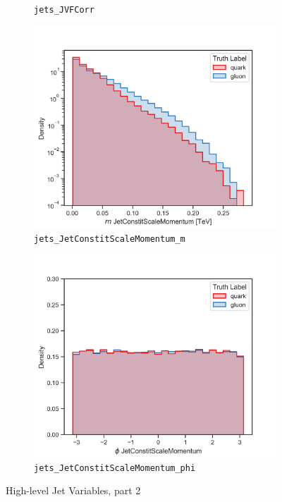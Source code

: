 \begin{figure}[!htb]
\begin{subfigure}[t]{0.48\textwidth}
		\caption{\texttt{jets\_JVFCorr}}
		\label{fig:highlevel_9}
	\end{subfigure}
	\begin{subfigure}[t]{0.48\textwidth}
		\includegraphics[width=1\textwidth]{src/plots/distributions/highlevel/jets_JetConstitScaleMomentum_m.png}
		\caption{\texttt{jets\_JetConstitScaleMomentum\_m}}
		\label{fig:highlevel_10}
	\end{subfigure}
	\begin{subfigure}[t]{0.48\textwidth}
		\includegraphics[width=1\textwidth]{src/plots/distributions/highlevel/jets_JetConstitScaleMomentum_phi.png}
		\caption{\texttt{jets\_JetConstitScaleMomentum\_phi}}
		\label{fig:highlevel_11}
	\end{subfigure}
\caption{High-level Jet Variables, part 2}
\label{fig:highlevel_6-11}
\end{figure}

